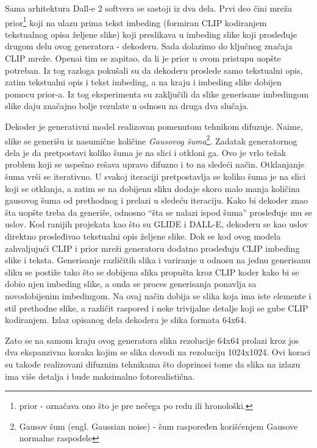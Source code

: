 \documentclass[12pt, letterpaper]{article}
\begin{document}
Sama arhitektura Dall-e 2 softvera se sastoji iz dva dela. Prvi deo čini mreža prior\footnote{prior - označava ono što je pre nečega po redu ili hronološki.} koji na ulazu prima tekst imbeding (formiran CLIP kodiranjem tekstualnog opisa željene slike) koji preslikava u imbeding slike koji prosleđuje drugom delu ovog generatora - dekoderu. Sada dolazimo do ključnog značaja CLIP mreže. Openai tim se zapitao, da li je prior u ovom pristupu uopšte potreban. Iz tog razloga pokušali su da dekoderu proslede samo tekstualni opis, zatim tekstualni opis i tekst imbeding, a na kraju i imbeding slike dobijen pomocu prior-a. Iz tog eksperimenta su zaključili da slike generisane imbedingom slike daju značajno bolje rezulate u odnosu na druga dva slučaja.\cite{openai_dali}

Dekoder je generativni model realizovan pomenutom tehnikom difuzuje. Naime, slike se generišu iz nasumične količine \textit{Gausovog šuma}\footnote{Gausov šum (engl. Gaussian noise) - šum raspoređen korišćenjem Gausove normalne raspodele}. Zadatak generatornog dela je da pretpostavi koliko šuma je na slici i otkloni ga. Ovo je vrlo težak problem koji se uspešno rešava upravo difuzno i to na sledeći način. Otklanjanje šuma vrši se iterativno\cite{gen1}. U svakoj iteraciji pretpostavlja se koliko šuma je na slici koji se otklanja, a zatim se na dobijenu sliku dodaje skoro malo manja količina gausovog šuma od prethodnog i prelazi u sledeću iteraciju. Kako bi dekoder znao šta uopšte treba da generiše, odnosno “šta se nalazi ispod šuma” prosleđuje mu se uslov. Kod ranijih projekata kao što su GLIDE i DALL-E\cite{openai_glide, openai_dali}, dekoderu se kao uslov direktno prosleđivao tekstualni opis željene slike. Dok se kod ovog modela zahvaljujući CLIP i prior mreži generatoru dodatno prosleđuju CLIP imbeding slike i teksta. Generisanje različitih slika i variranje u odnosu na jednu generisanu sliku se postiže tako što se dobijena slika propušta kroz CLIP koder kako bi se dobio njen imbeding slike, a onda se proces generisanja ponavlja sa novodobijenim imbedingom. Na ovaj način dobija se slika koja ima iste elemente i stil prethodne slike, a različit raspored i neke trivijalne detalje koji se gube CLIP kodiranjem. Izlaz opisanog dela dekodera je slika formata 64x64.

Zato se na samom kraju ovog generatora slika rezolucije 64x64 prolazi kroz jos dva ekspanzivna koraka kojim se slika dovodi na rezoluciju 1024x1024. Ovi koraci su takođe realizovani difuznim tehnikama što doprinosi tome da slika na izlazu ima više detalja i bude maksimalno fotorealistična.\cite{openai_dali}
\end{document}
